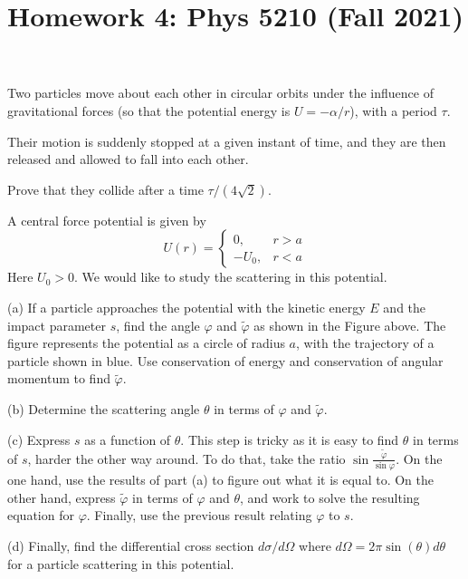 \documentclass[12pt]{article}
\title{Homework 4: Phys 5210 (Fall 2021)}
\begin{document}
\maketitle

\begin{problem}{1}
Two particles move about each other in circular orbits under the influence of
gravitational forces (so that the potential energy is $U=-\alpha / r$), with a
period $\tau$.

Their motion is suddenly stopped at a given instant of time, and they are then
released and allowed to fall into each other.

Prove that they collide after a time $\tau /(4\sqrt{2})$.
\begin{solution}
\end{solution}
\end{problem}
\begin{problem}{2}
A central force potential is given by
\begin{equation}
    U(r)=\begin{cases}
        0, & r>a\\
        -U_0, & r<a
    \end{cases}
\end{equation}
Here $U_0>0$. We would like to study the scattering in this potential.

(a) If a particle approaches the potential with the kinetic energy $E$ and the
impact parameter $s$, find the angle $\varphi$ and $\tilde{\varphi}$ as shown in
the Figure above. The figure represents the potential as a circle of radius $a$,
with the trajectory of a particle shown in blue. Use conservation of energy and
conservation of angular momentum to find $\tilde{\varphi}$.

(b) Determine the scattering angle $\theta$ in terms of $\varphi$ and
$\tilde{\varphi}$.

(c) Express $s$ as a function of $\theta$. This step is tricky as it is easy to
find $\theta$ in terms of $s$, harder the other way around. To do that, take the
ratio $\sin\frac{\tilde{\varphi}}{\sin\varphi}$. On the one hand, use the
results of part (a) to figure out what it is equal to. On the other hand,
express $\tilde{\varphi}$ in terms of $\varphi$ and $\theta$, and work to solve
the resulting equation for $\varphi$. Finally, use the previous result relating
$\varphi$ to $s$.

(d) Finally, find the differential cross section $d\sigma /d\Omega$ where
$d\Omega=2\pi\sin(\theta)d\theta$ for a particle scattering in this potential.
\begin{solution}
\end{solution}
\end{problem}
\end{document}
